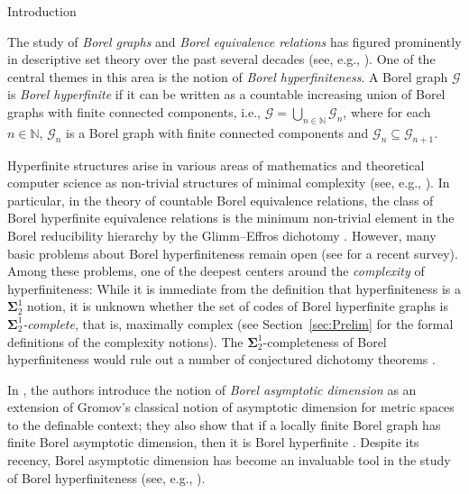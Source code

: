 \documentclass[psamsfonts]{amsart}
\theoremstyle{definition}
\newcommand{\N}{\mathbb N}
\theoremstyle{remark}
\numberwithin{equation}{section}
\newcommand\mbf{\mathbf}
\newcommand\mcal{\mathcal}
\begin{document}
\begin{section}{Introduction}

The study of \emph{Borel graphs} and \emph{Borel equivalence relations} has figured prominently in descriptive set theory over the past several decades (see, e.g., \cite{kst1999,km2004,jackson2019,mathe2019,km2020,pikhurko2021,bernshteyn2022,gv2024,kechris2024}).
One of the central themes in this area is the notion of \emph{Borel hyperfiniteness}.
A Borel graph $\mcal{G}$ is \emph{Borel hyperfinite} if it can be written as a countable increasing union of Borel graphs with finite connected components, i.e., $\mcal{G} = \bigcup_{n \in \N} \mcal{G}_n$, where for each $n \in \N$, $\mcal{G}_n$ is a Borel graph with finite connected components and $\mathcal{G}_n\subseteq\mathcal{G}_{n+1}$. 

Hyperfinite structures arise in various areas of mathematics and theoretical computer science as non-trivial structures of minimal complexity (see, e.g., \cite{connes1976,cfw1981,hkl1990,km2004,matui2012,lovasz2012,elek2018}).
In particular, in the theory of countable Borel equivalence relations, the class of Borel hyperfinite equivalence relations is the minimum non-trivial element in the Borel reducibility hierarchy by the Glimm--Effros dichotomy \cite{glimm1961,effros1965,effros1980,hkl1990}.
However, many basic problems about Borel hyperfiniteness remain open (see \cite{kechris2024} for a recent survey).
Among these problems, one of the deepest centers around the \emph{complexity} of hyperfiniteness: While it is immediate from the definition that hyperfiniteness is a $\mbf{\Sigma}^1_2$ notion, it is unknown whether the set of codes of Borel hyperfinite graphs is \emph{$\mbf{\Sigma}^1_2$-complete}, that is, maximally complex \cite{djk1994} (see Section~\ref{sec:Prelim} for the formal definitions of the complexity notions).
The $\mathbf{\Sigma}^1_2$-completeness of Borel hyperfiniteness would rule out a number of conjectured dichotomy theorems \cite{kechris2024}.

In \cite{cjmst2023}, the authors introduce the notion of \emph{Borel asymptotic dimension} as an extension of Gromov's classical notion of asymptotic dimension for metric spaces \cite{gromov1993} to the definable context; they also show that if a locally finite Borel graph has finite Borel asymptotic dimension, then it is Borel hyperfinite \cite[Theorem~7.1]{cjmst2023}.
Despite its recency, Borel asymptotic dimension has become an invaluable tool in the study of Borel hyperfiniteness (see, e.g., \cite{by2023,nv2023,is2024}).


\end{section}
\end{document}
